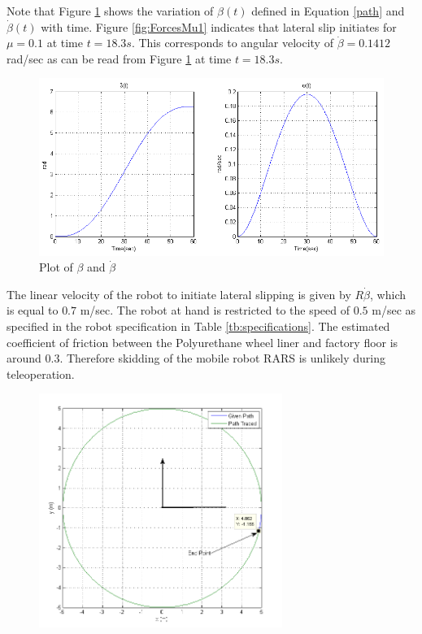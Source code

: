 {Note that Figure \ref{fig:beta1} shows the variation of $\beta(t)$ defined in Equation \ref{path} and $\dot\beta(t)$ with time.  Figure \ref{fig:ForcesMu1} indicates  that lateral slip initiates for $\mu=0.1$ at time $t=18.3s$. This corresponds to angular velocity of $ \dot \beta =0.1412 $ rad/sec as can be read from Figure \ref{fig:beta1} at time $t=18.3s$.
\begin{figure}
	\centering
	\includegraphics[width=\linewidth]{Chapter4/fig/beta}
	\caption{Plot of $\beta$ and $\dot{\beta}$}
	\label{fig:beta1}
\end{figure}
The linear velocity of the robot to initiate lateral slipping is given by $R\dot{\beta}$, which is equal to $0.7$  m/sec. The robot at hand is restricted to the speed of $0.5$ m/sec as specified in the robot specification in Table \ref{tb:specifications}. The estimated coefficient of friction between the Polyurethane wheel liner and factory floor is around $0.3$. Therefore skidding of the mobile robot RARS is unlikely during teleoperation. 
\begin{figure}
	\begin{minipage}[t]{0.5\textwidth}
		\centering
		\includegraphics[height=3in]{Chapter4/fig/PathWithMu-3slip}

\end{minipage}
\end{figure}}
